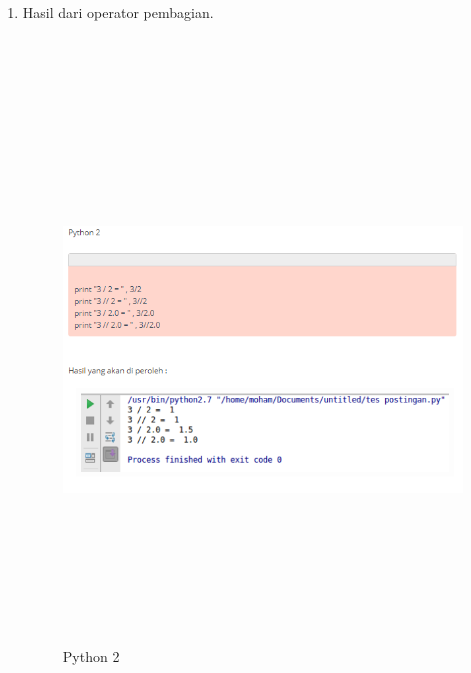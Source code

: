 \begin{enumerate}
\item 
Hasil dari operator pembagian.
\\
\\
\\
\begin{figure}[!htbp]
\centering
\includegraphics[width=15cm,height=15cm]{figures/5.PNG}
\caption{Python 2}
\label{penanda}
\end{figure}


\end{enumerate}
